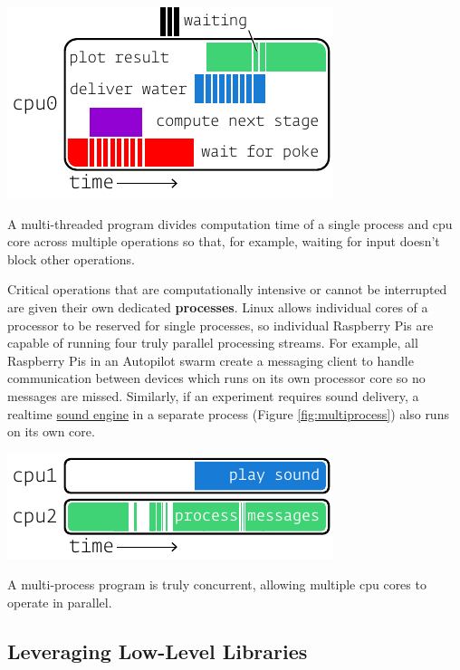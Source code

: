 \begin{marginfigure}
\includegraphics[]{figures/side_13_multithread.pdf}
\caption{A multi-threaded program divides computation time of a single process and cpu core across multiple operations so that, for example, waiting for input doesn't block other operations.}
\label{fig:multithread}
\end{marginfigure}

Critical operations that are computationally intensive or cannot be interrupted are given their own dedicated \textbf{processes}. Linux allows individual cores of a processor to be reserved for single processes, so individual Raspberry Pis are capable of running four truly parallel processing streams. For example, all Raspberry Pis in an Autopilot swarm create a messaging client to handle communication between devices which runs on its own processor core so no messages are missed. Similarly, if an experiment requires sound delivery, a realtime \hyperref[sec:stim]{sound engine} in a separate process (Figure \ref{fig:multiprocess}) also runs on its own core.

\begin{marginfigure}[0.1cm]
 \includegraphics[]{figures/side_14_multiprocess.pdf}
 \caption{A multi-process program is truly concurrent, allowing multiple cpu cores to operate in parallel.}
 \label{fig:multiprocess}
\end{marginfigure}

\subsection{Leveraging Low-Level Libraries}
\label{sec:lowlevel}

